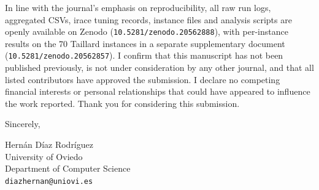 \documentclass[11pt,a4paper]{article}
\begin{document}
In line with the journal's emphasis on reproducibility, all raw run logs,
aggregated CSVs, irace tuning records, instance files and analysis scripts are
openly available on Zenodo (\texttt{10.5281/zenodo.20562888}), with per-instance
results on the 70 Taillard instances in a separate supplementary document
(\texttt{10.5281/zenodo.20562857}). I confirm that this manuscript has not been
published previously, is not under consideration by any other journal, and
that all listed contributors have approved the submission. I declare no
competing financial interests or personal relationships that could have
appeared to influence the work reported. Thank you for considering this
submission.

\bigskip

\noindent Sincerely,

\medskip

\noindent
Hern\'an D\'iaz Rodr\'iguez\\
University of Oviedo\\
Department of Computer Science\\
\texttt{diazhernan@uniovi.es}
\end{document}
